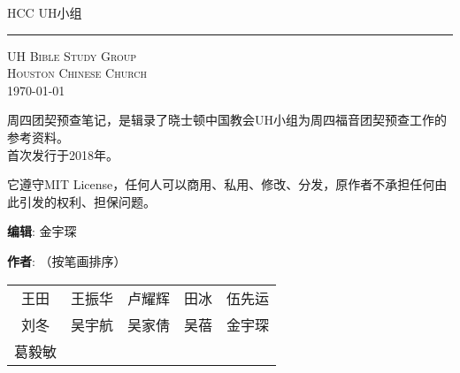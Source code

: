 \documentclass[Chinese]{CKBib}
\newcommand{\FormedWidth}{\paperwidth}
\newcommand{\FormedHeight}{\paperheight}
\newcommand{\Includepage}[2]{}
\begin{document}
\mainmatter

\thispagestyle{empty}
\pagestyle{empty}
\Includepage{-}{cover.pdf}

\clearpage

\thispagestyle{empty}
\pagestyle{empty}

\begin{center}

\vspace*{0.2in}

\LARGE \SansF HCC UH小组

\vspace*{0.13in}

\HUGE {}

\vspace*{0.18in}

\hrule

\vspace*{0.18in}

\Large 
\begin{minipage}{\textwidth}
\end{minipage}

\normalsize

\vspace*{0.68in}

\scshape UH Bible Study Group\\
Houston Chinese Church\\
\upshape \today
\end{center}

\clearpage

\begin{footnotesize}

\noindent 周四团契预查笔记，是辑录了晓士顿中国教会UH小组为周四福音团契预查工作的参考资料。\\
首次发行于2018年。

\vspace{1em}

\noindent 它遵守MIT License，任何人可以商用、私用、修改、分发，原作者不承担任何由此引发的权利、担保问题。

\vspace{1em}

\noindent \textbf{编辑}: 金宇琛

\vspace{1em}

\noindent \textbf{作者}: （按笔画排序）

\vspace{0.5em}

\begin{tabular}{ccccc}
  王田 & 王振华 & 卢耀辉 & 田冰 & 伍先运\\
  刘冬 & 吴宇航 & 吴家倩 & 吴蓓 &金宇琛 \\
  葛毅敏
\end{tabular}

\end{footnotesize}
\end{document}
